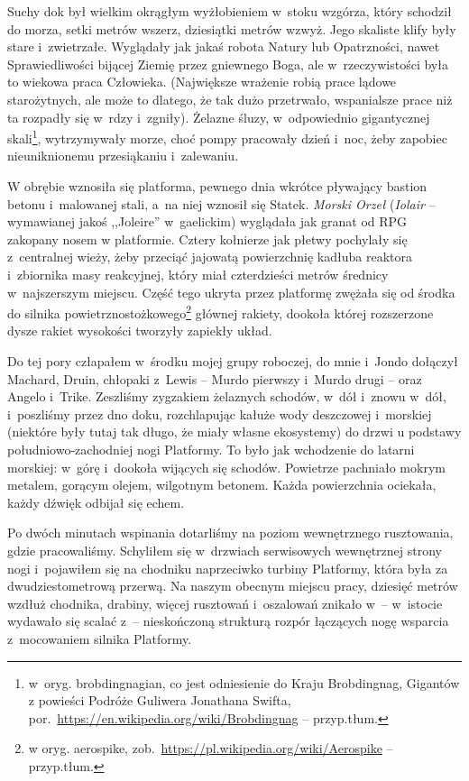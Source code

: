 \documentclass[oneside,polish,11pt,sfheadings]{mwbk}
\begin{document}
Suchy dok był wielkim okrągłym wyżłobieniem w~stoku wzgórza, który
schodził do morza, setki metrów wszerz, dziesiątki metrów wzwyż. Jego
skaliste klify były stare i~zwietrzałe. Wyglądały jak jakaś robota
Natury lub Opatrzności, nawet Sprawiedliwości bijącej Ziemię przez
gniewnego Boga, ale w~rzeczywistości była to wiekowa praca Człowieka.
(Największe wrażenie robią prace lądowe starożytnych, ale może to
dlatego, że tak dużo przetrwało, wspanialsze prace niż ta rozpadły się w~rdzy i~zgniły). Żelazne śluzy, w~odpowiednio gigantycznej skali\footnote{ w~oryg. brobdingnagian, co jest odniesienie do Kraju Brobdingnag, Gigantów
z powieści Podróże Guliwera Jonathana Swifta,
por.~\url{https://en.wikipedia.org/wiki/Brobdingnag} -- przyp.tłum.}, wytrzymywały morze, choć pompy pracowały dzień i~noc,
żeby zapobiec nieuniknionemu przesiąkaniu i~zalewaniu.

W obrębie wznosiła się platforma, pewnego dnia wkrótce pływający bastion
betonu i~malowanej stali, a~na niej wznosił się Statek. \textit{Morski
Orzeł} (\textit{Iolair} -- wymawianej jakoś
,,Joleire'' w~gaelickim) wyglądała jak granat od RPG zakopany nosem
w platformie. Cztery kołnierze jak płetwy pochylały się z~centralnej
wieży, żeby przeciąć jajowatą powierzchnię kadłuba reaktora i~zbiornika
masy reakcyjnej, który miał czterdzieści metrów średnicy w~najszerszym
miejscu. Część tego ukryta przez platformę zwężała się od środka do
silnika powietrznostożkowego\footnote{w oryg. aerospike,
zob.~\url{https://pl.wikipedia.org/wiki/Aerospike} -- przyp.tłum.} głównej rakiety, dookoła której rozszerzone dysze rakiet
wysokości tworzyły zapiekły układ.

Do tej pory człapałem w~środku mojej grupy roboczej, do mnie i~Jondo
dołączył Machard, Druin, chłopaki z~Lewis -- Murdo pierwszy i~Murdo drugi
-- oraz Angelo i~Trike. Zeszliśmy zygzakiem żelaznych schodów, w~dół i~znowu w~dół, i~poszliśmy przez dno doku, rozchlapując kałuże wody deszczowej i~morskiej (niektóre były tutaj tak długo, że miały własne ekosystemy) do
drzwi u podstawy południowo-zachodniej nogi Platformy. To było jak
wchodzenie do latarni morskiej: w~górę i~dookoła wijących się schodów.
Powietrze pachniało mokrym metalem, gorącym olejem, wilgotnym betonem.
Każda powierzchnia ociekała, każdy dźwięk odbijał się echem.

Po dwóch minutach wspinania dotarliśmy na poziom wewnętrznego
rusztowania, gdzie pracowaliśmy. Schyliłem się w~drzwiach serwisowych
wewnętrznej strony nogi i~pojawiłem się na chodniku naprzeciwko turbiny
Platformy, która była za dwudziestometrową przerwą. Na naszym obecnym
miejscu pracy, dziesięć metrów wzdłuż chodnika, drabiny, więcej
rusztowań i~oszalowań znikało w~-- w~istocie wydawało się scalać z~-- nieskończoną strukturą rozpór łączących nogę wsparcia z~mocowaniem
silnika Platformy.
\end{document}
